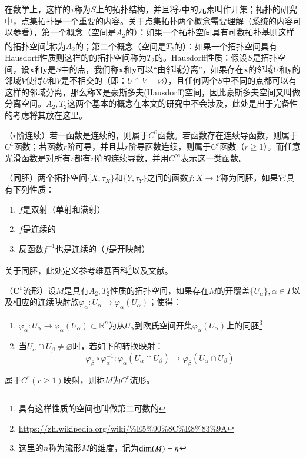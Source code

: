 在数学上，这样的$\tau$称为$S$上的拓扑结构，并且将$\tau$中的元素叫作开集；拓扑的研究中，点集拓扑是一个重要的内容。关于点集拓扑两个概念需要理解（系统的内容可以参看\cite{Manifold}），第一个概念（空间是$A_2$的）：如果一个拓扑空间具有可数拓扑基则这样的拓扑空间\footnote{具有这样性质的空间也叫做{\heiti 第二可数的}}称为$A_2$的；第二个概念（空间是$T_2$的）：如果一个拓扑空间具有Hausdorff性质则这样的的拓扑空间称为$T_2$的。Hausdorff性质：假设$S$是拓扑空间，设$\bm{x}$和$\bm{y}$是$S$中的点，我们称$\bm{x}$和$\bm{y}$可以“由邻域分离”，如果存在$\bm{x}$的邻域$U$和$\bm{y}$的邻域$V$使得$U$和$V$是不相交的（即：$U \cap V = \varnothing$），且任何两个$S$中不同的点都可以有这样的邻域分离，那么称$\bm{X}$是豪斯多夫(Hausdorff)空间，因此豪斯多夫空间又叫做分离空间。$A_2,T_2$这两个基本的概念在本文的研究中不会涉及，此处是出于完备性的考虑将其放在这里。
\begin{definition}
\label{C_r_Continuous}
{\heiti（$r$阶连续）}若一函数是连续的，则属于$C^0$函数。若函数存在连续导函数，则属于$C^1$函数；若函数$r$阶可导，并且其$r$阶导函数连续，则属于$C^r$函数（$r \geq 1$）。而任意光滑函数是对所有$r$都有$r$阶的连续导数，并用$C^\infty$表示这一类函数。
\end{definition}
\begin{definition}
\label{Homeomorphism}
{\heiti（同胚）}两个拓扑空间$\{X,\tau_X\}$和$\{Y,\tau_Y\}$之间的函数$f:X \rightarrow Y$称为同胚，如果它具有下列性质：
\begin{enumerate}
\item $f$是双射（单射和满射）
\item $f$是连续的
\item 反函数$f^{-1}$也是连续的（$f$是开映射）
\end{enumerate}
\end{definition}
关于同胚，此处定义参考维基百科\footnote{\url{https://zh.wikipedia.org/wiki/\%E5\%90\%8C\%E8\%83\%9A}}以及文献\cite{Manifold}。
\begin{definition}
\label{C_r_Manifold}
{\heiti（$\bm{C^r}$流形）}设$M$是具有$A_2,T_2$性质的拓扑空间，如果存在$M$的开覆盖$\{U_\alpha\},{\alpha \in \Gamma}$以及相应的连续映射族$\varphi_\alpha:U_\alpha \rightarrow \varphi_\alpha(U_\alpha)$；使得：
\begin{enumerate}
\item $\varphi_\alpha:U_\alpha \rightarrow \varphi_\alpha(U_\alpha) \subset \mathbb{R}^{n}$为从$U_\alpha$到欧氏空间开集$\varphi_\alpha(U_\alpha)$上的同胚\footnote{这里的$n$称为流形$M$的维度，记为${\rm dim}(M)=n$}
\item 当$U_\alpha \cap U_\beta \neq \varnothing$时，若如下的转换映射：
\begin{displaymath}
\varphi_{\beta} \circ \varphi_{\alpha}^{-1}:\varphi_\alpha(U_\alpha \cap U_\beta) \rightarrow \varphi_\beta(U_\alpha \cap U_\beta)
\end{displaymath}
\end{enumerate}
属于$C^r(r\geq 1)$映射，则称$M$为$C^r$流形。
\end{definition}
